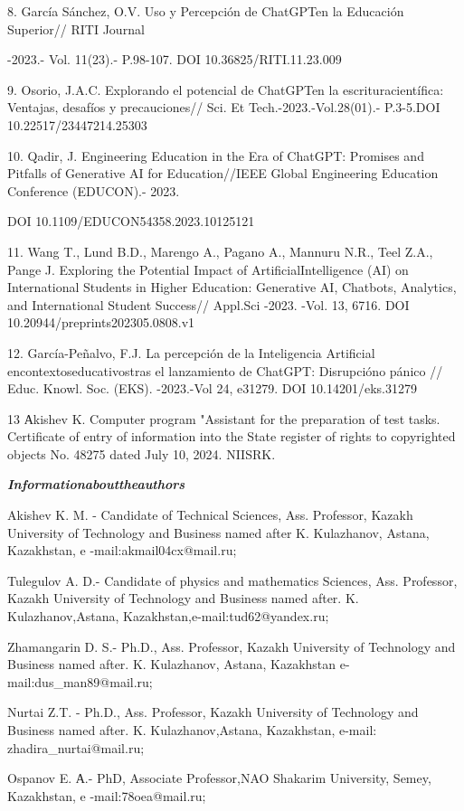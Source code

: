 8. García Sánchez, O.V. Uso y Percepción de ChatGPTen la Educación
Superior// RITI Journal

-2023.- Vol. 11(23).- P.98-107. DOI 10.36825/RITI.11.23.009

9. Osorio, J.A.C. Explorando el potencial de ChatGPTen la
escrituracientífica: Ventajas, desafíos y precauciones// Sci. Et
Tech.-2023.-Vol.28(01).- P.3-5.DOI 10.22517/23447214.25303

10. Qadir, J. Engineering Education in the Era of ChatGPT: Promises and
Pitfalls of Generative AI for Education//IEEE Global Engineering
Education Conference (EDUCON).- 2023.

DOI 10.1109/EDUCON54358.2023.10125121

11. Wang T., Lund B.D., Marengo A., Pagano A., Mannuru N.R., Teel Z.A.,
Pange J. Exploring the Potential Impact of ArtificialIntelligence (AI)
on International Students in Higher Education: Generative AI, Chatbots,
Analytics, and International Student Success// Appl.Sci -2023. -Vol. 13,
6716. DOI 10.20944/preprints202305.0808.v1

12. García-Peñalvo, F.J. La percepción de la Inteligencia Artificial
encontextoseducativostras el lanzamiento de ChatGPT: Disrupcióno pánico
// Educ. Knowl. Soc. (EKS). -2023.-Vol 24, e31279. DOI
10.14201/eks.31279

13 Аkishev K. Computer program "Assistant for the preparation of test
tasks. Certificate of entry of information into the State register of
rights to copyrighted objects No. 48275 dated July 10, 2024. NIISRK.

\emph{{\bfseries Informationabouttheauthors}}

Akishev K. M. - Candidate of Technical Sciences, Ass. Professor, Kazakh
University of Technology and Business named after K. Kulazhanov, Astana,
Kazakhstan, e -mail:akmail04cx@mail.ru;

Tulegulov A. D.- Candidate of physics and mathematics Sciences, Ass.
Professor, Kazakh University of Technology and Business named after. K.
Kulazhanov,Astana, Kazakhstan,e-mail:tud62@yandex.ru;

Zhamangarin D. S.- Ph.D., Ass. Professor, Kazakh University of
Technology and Business named after. K. Kulazhanov, Astana, Kazakhstan
e-mail:dus\_man89@mail.ru;

Nurtai Z.T. - Ph.D., Ass. Professor, Kazakh University of Technology and
Business named after. K. Kulazhanov,Astana, Kazakhstan, e-mail:
zhadira\_nurtai@mail.ru;

Ospanov E. А.- PhD, Associate Professor,NAO Shakarim University, Semey,
Kazakhstan, e -mail:78oea@mail.ru;

